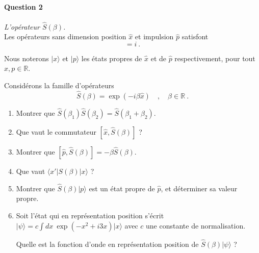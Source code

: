 \newpage
\ 

\newpage

\paragraph{Question 2} \textit{L'opérateur $\hat S(\beta)$.} \\

Les opérateurs sans dimension position $\hat x$ et impulsion $\hat p$ satisfont 
\begin{equation}
[\hat x, \hat p ] = i\ .
\label{xp:1}
\end{equation}

Nous noterons $\lvert x \rangle$ et $\lvert p \rangle$ les états propres de $\hat x$ et de $\hat p $ respectivement, pour tout $x, p \in \mathbb{R}$.

Considérons la famille d'opérateurs
\begin{equation}
\hat S(\beta) = \exp \left( -i \beta \hat x \right)\quad , \quad \beta \in \mathbb{R}\ .
\end{equation}




\begin{enumerate}


\item 
Montrer que $\hat S(\beta_1) \hat S(\beta_2)=\hat S(\beta_1 + \beta_2) $. 

\item
Que vaut le commutateur $[ \hat x,  \hat S(\beta)]$ ?

\item
Montrer que $[ \hat p,  \hat S(\beta)] = - \beta \hat S(\beta)$.


\item
Que vaut $\langle x' \rvert S(\beta) \lvert x \rangle$ ?

\item
Montrer que $\hat S(\beta) \lvert p \rangle$ est un état propre de $\hat p$, et déterminer sa valeur propre.

\item Soit l'état qui en représentation position s'écrit $\lvert \psi\rangle = c\int dx\ \exp (-x^2 + i 3 x)\lvert x \rangle$  avec $c$ une constante de normalisation.

Quelle est la fonction d'onde en représentation position de 
$\hat S(\beta) \lvert \psi\rangle $ ?


\end{enumerate}



